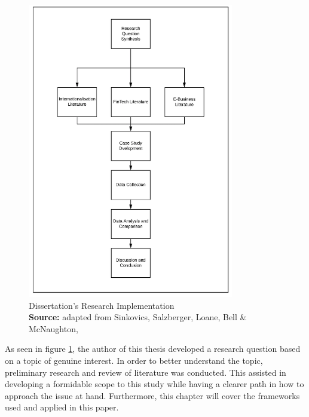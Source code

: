 \documentclass[11pt,a4paper]{article}
\newcommand*{\captionsource}[2]{%
  \caption[{#1}]{%
    #1%
    \\\hspace{\linewidth}%
    \textbf{Source:} #2%
  }%
}
\begin{document}
{{\begin{figure}[H]
	\centering
  \includegraphics[width=90mm]{figures/fig_research_plan}
  \vspace{5mm}
    \captionsetup{justification=centering,margin=2cm}
      \captionsource{Dissertation's Research Implementation}{adapted from Sinkovics, Salzberger, Loane, Bell \& McNaughton, \citeyear{sinkovicsEmployingInformationCommunication2006}}
	\label{fig:research_plan}
\end{figure}


As seen in figure \ref{fig:research_plan}, the author of this thesis developed a research question based on a topic of genuine interest. In order to better understand the topic, preliminary research and review of literature was conducted. This assisted in developing a formidable scope to this study while having a clearer path in how to approach the issue at hand. Furthermore, this chapter will cover the frameworks used and applied in this paper.


}}
\end{document}

